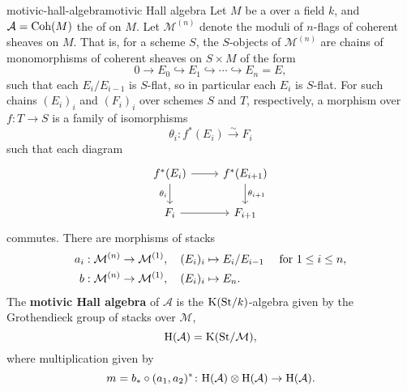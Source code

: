 \begin{topic}{motivic-hall-algebra}{motivic Hall algebra}
    Let $M$ be a   over a field $k$, and $\mathcal{A} = \textup{Coh}(M)$ the  of  on $M$. Let $\mathcal{M}^{(n)}$ denote the moduli  of $n$-flags of coherent sheaves on $M$. That is, for a scheme $S$, the $S$-objects of $\mathcal{M}^{(n)}$ are chains of monomorphisms of coherent sheaves on $S \times M$ of the form
    \[ 0 \to E_0 \hookrightarrow E_1 \hookrightarrow \cdots \hookrightarrow E_n = E , \]
    such that each $E_i/E_{i - 1}$ is $S$-flat, so in particular each $E_i$ is $S$-flat. For such chains $(E_i)_i$ and $(F_i)_i$ over schemes $S$ and $T$, respectively, a morphism over $f \colon T \to S$ is a family of isomorphisms
    \[ \theta_i : f^*(E_i) \xrightarrow{\sim} F_i \]
    such that each diagram
    \[ \svg \begin{tikzcd} f^*(E_i) \arrow[swap]{d}{\theta_i} \arrow{r} & f^*(E_{i + 1}) \arrow{d}{\theta_{i + 1}} \\ F_i \arrow{r} & F_{i + 1} \end{tikzcd} \]
    commutes.
    There are morphisms of stacks
    \[ \begin{aligned}
        a_i &: \mathcal{M}^{(n)} \to \mathcal{M}^{(1)}, \quad (E_i)_i \mapsto E_i/E_{i - 1} \quad \textup{ for } 1 \le i \le n , \\
        b &: \mathcal{M}^{(n)} \to \mathcal{M}^{(1)}, \quad (E_i)_i \mapsto E_n .
    \end{aligned} \]
    The \textbf{motivic Hall algebra} of $\mathcal{A}$ is the $\textup{K}(\textup{St}/k)$-algebra given by the Grothendieck group of stacks over $\mathcal{M}$,
    \[ \textup{H}(\mathcal{A}) = \textup{K}(\textup{St}/\mathcal{M}) , \]
    where multiplication given by
    \[ m = b_* \circ (a_1, a_2)^* \colon \textup{H}(\mathcal{A}) \otimes \textup{H}(\mathcal{A}) \to \textup{H}(\mathcal{A}) . \]
\end{topic}
